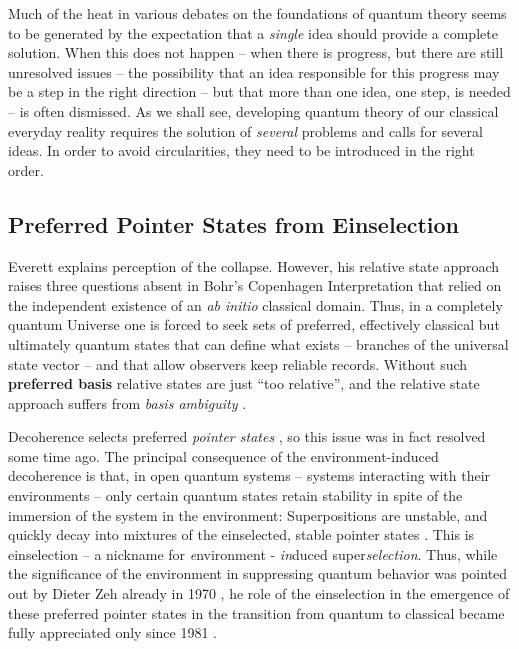 \documentclass[aps,amsmath,amssymb,amsfonts,floatfix]{revtex4-1}
\newcommand{\+}         {\dagger}
\begin{document}
Much of the heat in various debates on the foundations of quantum theory seems to be generated by the expectation that a {\it single} idea should provide a complete solution.
When this does not happen -- when there is progress, but there are still unresolved issues -- the possibility that an idea
responsible for this progress may be a step in the right direction -- but that more than one idea, one step, is needed -- is often dismissed.
As we shall see, developing quantum theory of our classical everyday reality requires the solution of {\it several} problems and calls
for several ideas. In order to avoid circularities, they need to be introduced in the right order. 

\subsection{Preferred Pointer States from Einselection}

Everett explains perception of the collapse. However, his relative state approach raises three questions
absent in Bohr's Copenhagen Interpretation \cite{11} that relied on the independent existence
of an {\it ab initio} classical domain. 
Thus, in a completely quantum Universe one is forced to seek
sets of preferred, effectively classical but ultimately quantum states that can define what exists -- branches of the universal
state vector -- and that allow observers keep reliable records. Without such
{\bf preferred basis} relative states are just ``too relative'', and the relative state approach suffers from {\it basis ambiguity} \cite{69}.

Decoherence selects preferred {\it pointer states} \cite{69,70, 71}, so this issue was in fact resolved some time ago.  The principal consequence of the environment-induced decoherence is that, in open quantum systems -- systems interacting with their environments -- only certain quantum states retain stability in spite of the immersion of the system in the environment: Superpositions are unstable, and quickly decay into mixtures of the einselected, stable pointer states \cite{ZurekNatPhys, ZurekPT, Z07a, Zurekbook, 69, Zeh, 70, 71, 45, 36, 72, 73, 75, 51,52}. This is einselection -- a nickname for {\it e}nvironment - {\it in}duced super{\it selection}. Thus, while the significance of the environment in suppressing quantum behavior was pointed out by Dieter Zeh already in 1970 \cite{67}, he role of the einselection in the emergence of these preferred pointer states in the transition from quantum to classical became fully appreciated only since 1981 \cite{ZehDark}.
\end{document}
